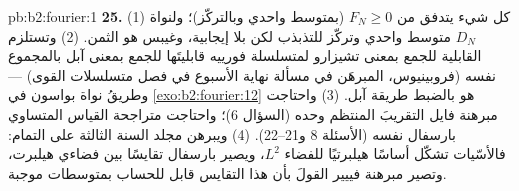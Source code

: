 \begin{solution}{pb:b2:fourier:1}
\textbf{25.} (1) كل شيء يتدفق من $F_N \geq 0$ (بمتوسط
واحدي وبالتركّز)؛ ولنواة $D_N$ متوسط واحدي وتركّز
للتذبذب لكن بلا إيجابية، وغيبس هو الثمن.
(2) وتستلزم القابلية للجمع بمعنى تشيزارو لمتسلسلة فورييه
قابليتَها للجمع بمعنى آبل بالمجموع نفسه (فروبينيوس، المبرهَن في
مسألة نهاية الأسبوع في فصل متسلسلات القوى) --- وطريقُ نواة
بواسون في \cref{exo:b2:fourier:12} هو بالضبط طريقة آبل.
(3) واحتاجت مبرهنة فايل التقريبَ المنتظم وحده
(السؤال 6)؛ واحتاجت متراجحة القياس المتساوي بارسفال
نفسه (الأسئلة 8 و21--22). (4) ويبرهن مجلد السنة الثالثة على
التمام: فالأسّيات تشكّل أساسًا هيلبرتيًا للفضاء $L^2$،
ويصير بارسفال تقايسًا بين فضاءي هيلبرت، وتصير مبرهنة
فييير القولَ بأن هذا التقايس قابل للحساب
بمتوسطات موجبة.
\end{solution}
